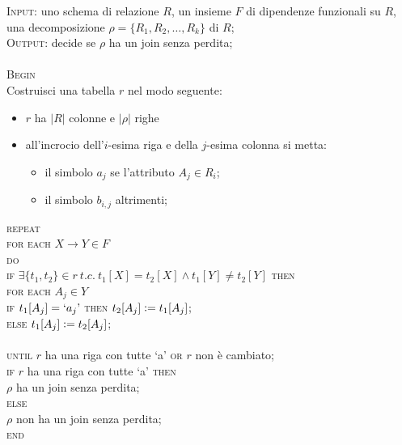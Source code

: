 \begin{alg}
 \textsc{Input}: uno schema di relazione $R$, un insieme $F$ di dipendenze funzionali su $R$, una decomposizione
 $\rho = \{R_1, R_2, \ldots, R_k\}$ di $R$;\\
 \textsc{Output}: decide se $\rho$ ha un join senza perdita;\\\\
 \textsc{Begin}\\
 Costruisci una tabella $r$ nel modo seguente:
 \begin{itemize}
  \item $r$ ha $|R|$ colonne e $|\rho|$ righe
  \item all'incrocio dell'$i$-esima riga e della $j$-esima colonna si metta:
  \begin{itemize}
   \item il simbolo $a_j$ se l'attributo $A_j \in R_i$;
   \item il simbolo $b_{i,j}$ altrimenti;
  \end{itemize}
 \end{itemize}
 \textsc{repeat}\\
 \indent \textsc{for each} $X\rightarrow Y \in F$\\
 \indent \indent \textsc{do}\\
 \indent \indent \textsc{if} $\exists \{t_1, t_2\} \in r\ t.c.\ t_1[X]=t_2[X] \wedge t_1[Y]\not= t_2[Y]$ \textsc{then}\\
 \indent \indent \indent \textsc{for each} $A_j \in Y$\\
 \indent \indent \indent \indent \textsc{if} $t_1[A_j]=`a_j\text{'}$ \textsc{then} $t_2[A_j]\vcentcolon= t_1[A_j]$;\\
 \indent \indent \indent \indent \textsc{else} $t_1[A_j]\vcentcolon= t_2[A_j]$;\\\\
 \textsc{until} $r$ ha una riga con tutte `a' \textsc{or} $r$ non è cambiato;\\
 \textsc{if} $r$ ha una riga con tutte `a' \textsc{then}\\
 \indent $\rho$ ha un join senza perdita;\\
 \textsc{else}\\
 \indent $\rho$ non ha un join senza perdita;\\
 \textsc{end}\\
\end{alg}

